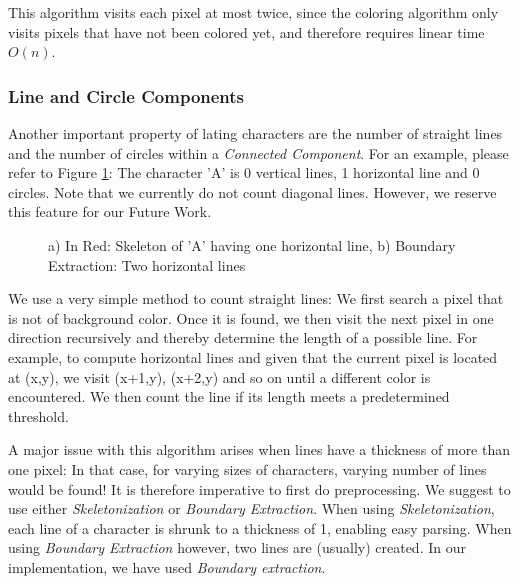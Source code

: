 \documentclass{article}
\begin{document}
This algorithm visits each pixel at most twice, since the coloring algorithm only visits pixels that have not been colored yet, and therefore requires linear time $O(n)$.

\subsubsection{Line and Circle Components}
Another important property of lating characters are the number of straight lines and the number of circles within a \textit{Connected Component}. For an example, please refer to Figure \ref{fig:lines}: The character 'A' is 0 vertical lines, 1 horizontal line and 0 circles. Note that we currently do not count diagonal lines. However, we reserve this feature for our Future Work.

\begin{figure}
 \centering
 
 \caption{a) In Red: Skeleton of 'A' having one horizontal line, b) Boundary Extraction: Two horizontal lines}
\label{fig:lines}
\end{figure}

We use a very simple method to count straight lines: We first search a pixel that is not of background color. Once it is found, we then visit the next pixel in one direction recursively and thereby determine the length of a possible line. For example, to compute horizontal lines and given that the current pixel is located at (x,y), we visit (x+1,y), (x+2,y) and so on until a different color is encountered. We then count the line if its length meets a predetermined threshold.

A major issue with this algorithm arises when lines have a thickness of more than one pixel: In that case, for varying sizes of characters, varying number of lines would be found! It is therefore imperative to first do preprocessing. We suggest to use either \textit{Skeletonization} or \textit{Boundary Extraction}. When using \textit{Skeletonization}, each line of a character is shrunk to a thickness of 1, enabling easy parsing. When using \textit{Boundary Extraction} however, two lines are (usually) created. In our implementation, we have used \textit{Boundary extraction}.
\end{document}
